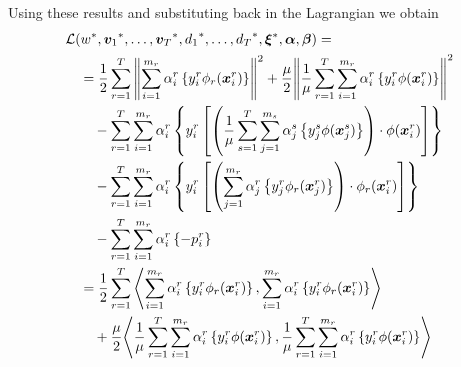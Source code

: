 
Using these results and substituting back in the Lagrangian we obtain
\begin{equation}\nonumber
    \begin{aligned}
        &  \lagr(\optim{{w}}, \optim{\fv{v}_1}, \ldots, \optim{\fv{v}_\ntasks}, \optim{d_1}, \ldots, \optim{d_\ntasks}, \optim{\fv{\xi}}, \fv{\alpha}, \fv{\beta}) =\\
        &\quad =  \frac{1}{2} \sum_{r= 1}^T{\norm{\sum_{i=1}^{m_r} {\alpha_i^r} \left\lbrace y_i^r \phi_r(\fv{x}_i^r) \right\rbrace}^2} + \frac{\mu}{2} {\norm{ \frac{1}{\mu}\sum_{r= 1}^T \sum_{i=1}^{m_r} {\alpha_i^r} \left\lbrace y_i^r \phi(\fv{x}_i^r) \right\rbrace}}^2 \\
        &\qquad -  \sum_{r= 1}^T \sum_{i=1}^{m_r} \alpha_i^r \left\lbrace y_{i}^r \left[ \left(\frac{1}{\mu} \sum_{s= 1}^T \sum_{j=1}^{m_s} {\alpha_j^s} \left\lbrace y_j^s \phi(\fv{x}_j^s) \right\rbrace \right) \cdot \phi(\fv{x}_{i}^r) \right]  \right\rbrace \\
        &\qquad -  \sum_{r= 1}^T \sum_{i=1}^{m_r} \alpha_i^r \left\lbrace y_{i}^r \left[  \left( \sum_{j=1}^{m_r} {\alpha_j^r} \left\lbrace y_j^r \phi_r(\fv{x}_j^r) \right\rbrace \right) \cdot \phi_r(\fv{x}_{i}^r)  \right]  \right\rbrace \\
        &\qquad -  \sum_{r= 1}^T \sum_{i=1}^{m_r} \alpha_i^r \left\lbrace - p_{i}^r  \right\rbrace \\
        &\quad =  \frac{1}{2} \sum_{r= 1}^T{\dotp{\sum_{i=1}^{m_r} {\alpha_i^r} \left\lbrace y_i^r \phi_r(\fv{x}_i^r) \right\rbrace}{\sum_{i=1}^{m_r} {\alpha_i^r} \left\lbrace y_i^r \phi_r(\fv{x}_i^r) \right\rbrace}} \\
        &\qquad + \frac{\mu}{2} {\dotp{ \frac{1}{\mu}\sum_{r= 1}^T \sum_{i=1}^{m_r} {\alpha_i^r} \left\lbrace y_i^r \phi(\fv{x}_i^r) \right\rbrace}{ \frac{1}{\mu}\sum_{r= 1}^T \sum_{i=1}^{m_r} {\alpha_i^r} \left\lbrace y_i^r \phi(\fv{x}_i^r) \right\rbrace}} \\

\end{aligned}
\end{equation}
